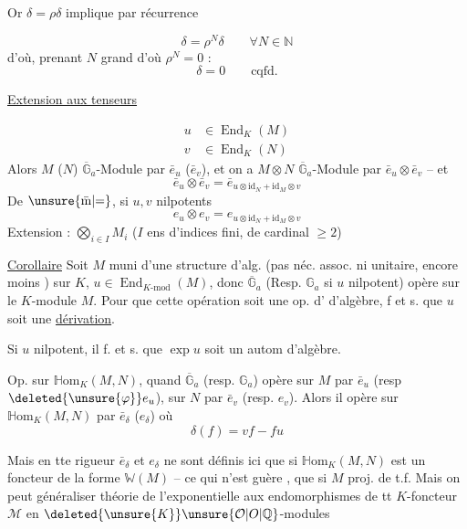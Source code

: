Or $\delta=\rho\delta$ implique par récurrence

\[
\delta=\rho^N\delta\qquad\forall N\in\mathbb N
\]
d'où, prenant $N$ grand d'où $\rho^N=0$ :
\[
\delta=0\qquad\text{cqfd.}
\]

\uline{Extension aux tenseurs}

\[
\begin{aligned}
u&\in\operatorname{End}_K(M)\\
v&\in\operatorname{End}_K(N)
\end{aligned}
\]
Alors $M$ ($N$) $\overline{\mathbb G}_a$-Module par $\bar e_u$ ($\bar e_v$), et on a $M\otimes N$ $\overline{\mathbb G}_a$-Module par $\bar e_u\otimes\bar e_v$ -- et
\[
\bar e_u\otimes\bar e_v=\bar e_{u\otimes\mathrm{id}_N+\mathrm{id}_M\otimes v}
\]
De $\unsure{\bar{\mathrm m}|{=}}$, si $u,v$ nilpotents
\[
e_u\otimes e_v=e_{u\otimes\mathrm{id}_N+\mathrm{id}_M\otimes v}
\]
Extension : $\bigotimes_{i\in I}M_i$ ($I$ ens d'indices fini, de cardinal $\geq2$)

\uline{Corollaire} Soit $M$ muni d'une structure d'alg. (pas néc. assoc. ni unitaire, encore moins ) sur $K$, $u\in\operatorname{End}_{K\text{-mod}}(M)$, donc $\overline{\mathbb G}_a$ (Resp. $\mathbb G_a$ si $u$ nilpotent) opère sur le $K$-module $M$. Pour que cette opération soit une op. d' d'algèbre,  f et s. que $u$ soit une \uline{dérivation}.

Si $u$ nilpotent, il f. et s. que $\exp u$ soit un autom d'algèbre.

Op. sur $\mathbb H\mathrm{om}_K(M,N)$, quand $\overline{\mathbb G}_a$ (resp. $\mathbb G_a$) opère sur $M$ par $\bar e_u$ (resp $\deleted{\unsure{\varphi}}e_u$), sur $N$ par $\bar e_v$ (resp. $e_v$). Alors il opère sur $\mathbb H\mathrm{om}_K(M,N)$ par $\bar e_\delta$ ($e_\delta$) où
\[
\delta(f)=vf-fu
\]

Mais en tte rigueur $\bar e_\delta$ et $e_\delta$ ne sont définis ici que si $\mathbb H\mathrm{om}_K(M,N)$ est  un foncteur de la forme $\mathbb W(M)$ -- ce qui n'est guère , que si $M$ proj. de t.f. Mais on peut généraliser théorie de l'exponentielle aux  endomorphismes de tt $K$-foncteur $\mathcal M$ en $\deleted{\unsure{K}}\unsure{\mathcal O|O|\mathbb Q}$-modules

